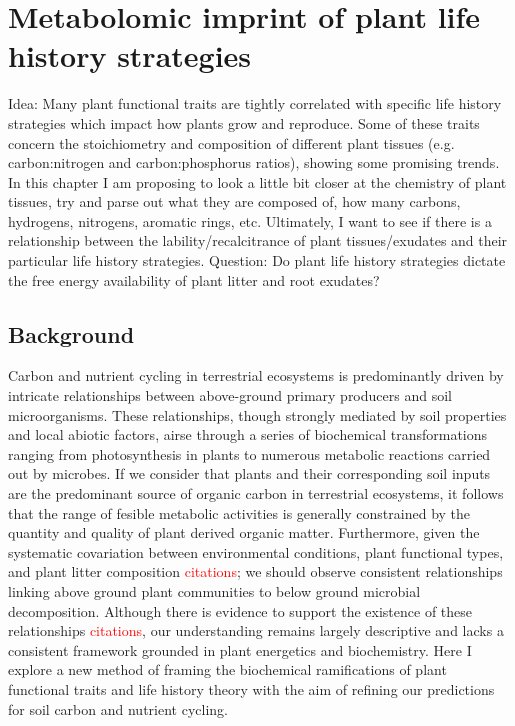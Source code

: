 \chapter{Metabolomic imprint of plant life history strategies}


Idea: Many plant functional traits are tightly correlated with specific life history strategies which impact how plants grow and reproduce. Some of these traits concern the stoichiometry and composition of different plant tissues (e.g. carbon:nitrogen and carbon:phosphorus ratios), showing some promising trends. In this chapter I am proposing to look a little bit closer at the chemistry of plant tissues, try and parse out what they are composed of, how many carbons, hydrogens, nitrogens, aromatic rings, etc. Ultimately, I want to see if there is a relationship between the lability/recalcitrance of plant tissues/exudates and their particular life history strategies.
Question: Do plant life history strategies dictate the free energy availability of plant litter and root exudates?

\section{Background}


Carbon and nutrient cycling in terrestrial ecosystems is predominantly driven by intricate relationships between above-ground primary producers and soil microorganisms. These relationships, though strongly mediated by soil properties and local abiotic factors, airse through a series of biochemical transformations ranging from photosynthesis in plants to numerous metabolic reactions carried out by microbes. If we consider that plants and their corresponding soil inputs are the predominant source of organic carbon in terrestrial ecosystems, it follows that the range of fesible metabolic activities is generally constrained by the quantity and quality of plant derived organic matter. Furthermore, given the systematic covariation between environmental conditions, plant functional types, and plant litter composition \textcolor{red}{citations}; we should observe consistent relationships linking above ground plant communities to below ground microbial decomposition. Although there is evidence to support the existence of these relationships \textcolor{red}{citations}, our understanding remains largely descriptive and lacks a consistent framework grounded in plant energetics and biochemistry. Here I explore a new method of framing the biochemical ramifications of plant functional traits and life history theory with the aim of refining our predictions for soil carbon and nutrient cycling. 

